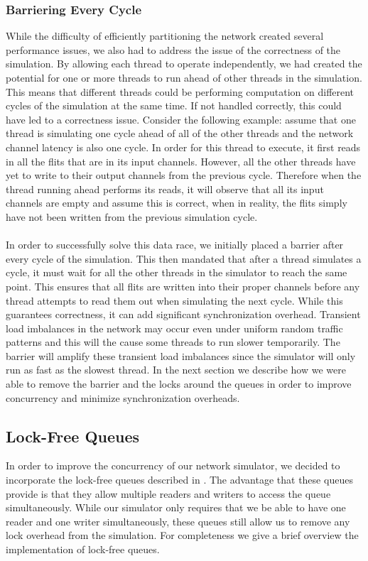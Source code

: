 \documentclass[twocolumn]{article}
\begin{document}
\subsubsection{Barriering Every Cycle}
While the difficulty of efficiently partitioning the network created
several performance issues, we also had to address the issue of the
correctness of the simulation.  By allowing each thread to operate
independently, we had created the potential for one or more threads to run
ahead of other threads in the simulation.  This means that different
threads could be performing computation on different cycles of the
simulation at the same time.  If not handled correctly, this could have
led to a correctness issue.  Consider the following example: assume that
one thread is simulating one cycle ahead of all of the other threads and the network channel latency is also one cycle.  In
order for this thread to execute, it first reads in all the flits that are
in its input channels.  However, all the other threads have yet to write
to their output channels from the previous cycle.  Therefore when the thread running ahead
performs its reads, it will observe that all its input channels are empty
and assume this is correct, when in reality, the flits simply have not
been written from the previous simulation cycle.\\
~\\
In order to successfully solve this data race, we initially placed a
barrier after every cycle of the simulation.  This then mandated that
after a thread simulates a cycle, it must wait for all the other threads
in the simulator to reach the same point.  This ensures that all flits are
written into their proper channels before any thread attempts to read them
out when simulating the next cycle.  While this guarantees correctness, it
can add significant
synchronization overhead. Transient load imbalances in the network may occur even under uniform random traffic patterns and this will the cause some threads to run slower temporarily. The barrier will amplify these transient load imbalances since the simulator will only run as fast as the slowest thread. In the next section we describe how we were
able to remove the barrier and the locks around the queues in order to
improve concurrency and minimize synchronization overheads.

\subsection{Lock-Free Queues}
In order to improve the concurrency of our network simulator, we decided
to incorporate the lock-free queues described in \cite{LF}.  The advantage
that these queues provide is that they allow multiple readers and writers
to access the queue simultaneously.  While our simulator only requires that we
be able to have one reader and one writer simultaneously, these queues
still allow us to remove any lock overhead from the simulation.  For
completeness we give a brief overview the implementation of lock-free
queues.
\end{document}
